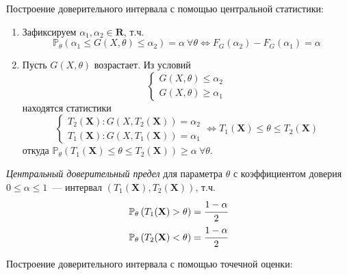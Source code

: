 Построение доверительного интервала с помощью центральной статистики:
\begin{enumerate}
    \item Зафиксируем $\alpha_{1}, \alpha_{2} \in \mathbf{R}$, т.ч.
    \begin{equation*}
        \mathbb{P}_{\theta}(\alpha_{1} \leqslant G(X, \theta) \leqslant \alpha_{2})=\alpha~\forall \theta \Leftrightarrow F_{G}(\alpha_{2})-F_{G}(\alpha_{1})=\alpha
    \end{equation*}
    \item Пусть $G(X,\theta)$ возрастает. Из условий
    \begin{equation*}
        \left\{\begin{array}{l}
        G(X, \theta) \leqslant \alpha_{2} \\
        G(X, \theta) \geqslant \alpha_{1}
        \end{array}\right.
    \end{equation*}
    находятся статистики
    \begin{equation*}
        \left\{\begin{array}{l}
            T_{2}(\mathbf{X}): G(X, T_{2}(\mathbf{X}))=\alpha_{2} \\ 
            T_{1}(\mathbf{X}): G(X, T_{1}(\mathbf{X}))=\alpha_{1}
        \end{array} 
        \Leftrightarrow T_{1}(\mathbf{X}) \leqslant \theta \leqslant T_{2}(\mathbf{X})\right.
    \end{equation*}
    откуда $\mathbb{P}_{\theta}\left(T_{1}(\mathbf{X}) \leqslant \theta \leqslant T_{2}(\mathbf{X})\right) \geqslant \alpha~ \forall \theta$.
\end{enumerate}

\begin{defn}
{\it Центральный доверительный предел} для параметра $\theta$ с коэффициентом доверия $0 \leqslant \alpha \leqslant 1$~--- интервал $(T_1(\mathbf{X}), T_2(\mathbf{X}))$, т.ч. 
\begin{gather*}
    \mathbb{P}_{\theta}\left(T_{1}(\mathbf{X})>\theta\right)=\cfrac{1-\alpha}{2} \\
    \mathbb{P}_{\theta}\left(T_{2}(\mathbf{X})<\theta\right)=\cfrac{1-\alpha}{2}
\end{gather*}
\end{defn}

Построение доверительного интервала с помощью точечной оценки:

